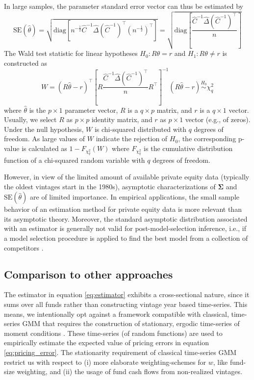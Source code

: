 \documentclass[12pt]{article}
\begin{document}
In large samples, the parameter standard error vector can thus be estimated by
\[
\mathrm{SE}(\hat{\theta}) = 
\sqrt{
	\mathrm{diag} \left[
	n^{-\frac{1}{2}}
	\hat{C}^{-1} \hat{\Delta} (\hat{C}^{-1})^\top
	(n^{-\frac{1}{2}})^\top
	\right] 
}
=
\sqrt{
	\mathrm{diag} \left[
	\frac{\hat{C}^{-1} \hat{\Delta} (\hat{C}^{-1})^\top}{n}
	\right] 
}
\]
The Wald test statistic for linear hypotheses $H_0: R \theta = r$ and $H_1: R \theta \neq r$ is constructed as
\[
W = 
(R \hat{\theta} - r)^\top
\left[
R
\frac{\hat{C}^{-1} \hat{\Delta} (\hat{C}^{-1})^\top}{n}
R^\top
\right]^{-1}
(R \hat{\theta} - r)
\stackrel{H_0}{\sim}
\chi_q^2
\]
where $\hat{\theta}$ is the $p \times 1$ parameter vector, $R$ is a $q \times p$ matrix, and $r$ is a $q \times 1$ vector.
Usually, we select $R$ as $p \times p$ identity matrix, and $r$ as $p \times 1$ vector (e.g., of zeros).
Under the null hypothesis, $W$ is chi-squared distributed with $q$ degrees of freedom. As large values of $W$ indicate the rejection of $H_0$, the corresponding p-value is calculated as $1 - F_{\chi_q^2}(W)$ where $F_{\chi_q^2}$ is the cumulative distribution function of a chi-squared random variable with $q$ degrees of freedom.

However, in view of the limited amount of available private equity data (typically the oldest vintages start in the 1980s), asymptotic characterizations of $\mathbf{\Sigma}$ and $\mathrm{SE}(\hat{\theta})$ are of limited importance. 
In empirical applications, the small sample behavior of an estimation method for private equity data is more relevant than its asymptotic theory.
Moreover, the standard asymptotic distribution associated with an estimator is generally not valid for post-model-selection inference, i.e., if a model selection procedure is applied to find the best model from a collection of competitors \citep{LP05}.


\subsection{Comparison to other approaches}

The estimator in equation \ref{eq:estimator} exhibits a cross-sectional nature, since it sums over all funds rather than constructing vintage year based time-series.
This means, we intentionally opt against a framework compatible with classical, time-series GMM that requires the construction of stationary, ergodic time-series of moment conditions \citep{H82,H12}.
These time-series (of random functions) are used to empirically estimate the expected value of pricing errors in equation \ref{eq:pricing_error}.
The stationarity requirement of classical time-series GMM restrict us with respect to (i) more elaborate weighting-schemes for $w$, like fund-size weighting, and (ii) the usage of fund cash flows from non-realized vintages.
\end{document}
